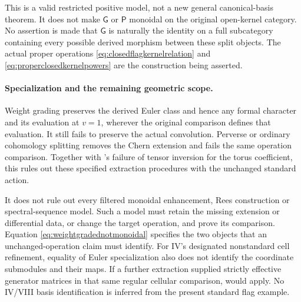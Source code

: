 This is a valid restricted positive model, not a new general
canonical-basis theorem. It does not make \(\mathsf G\) or
\(\mathsf P\) monoidal on the original open-kernel category.
No assertion is made that \(\mathsf G\) is naturally the
identity on a full subcategory containing every possible
derived morphism between these split objects. The actual
proper operations \eqref{eq:closedflagkernelrelation} and
\eqref{eq:properclosedkernelpowers} are the construction
being asserted.

\paragraph{Specialization and the remaining geometric scope.}
Weight grading preserves the derived Euler class and hence
any formal character and its evaluation at \(v=1\), wherever
the original comparison defines that evaluation. It still
fails to preserve the actual convolution. Perverse or ordinary
cohomology splitting removes the Chern extension and fails
the same operation comparison. Together with 's
failure of tensor inversion for the torus coefficient, this
rules out these specified extraction procedures with the
unchanged standard action.

It does not rule out every filtered monoidal enhancement,
Rees construction or spectral-sequence model. Such a model
must retain the missing extension or differential data, or
change the target operation, and prove its comparison.
Equation \eqref{eq:weightgradednotmonoidal} specifies the
two objects that an unchanged-operation claim must identify.
For IV's designated nonstandard cell refinement, equality
of Euler specialization also does not identify the coordinate
submodules and their maps. If a further extraction supplied
strictly effective generator matrices in that same regular
cellular comparison,  would apply. No IV/VIII basis
identification is inferred from the present standard flag
example.


